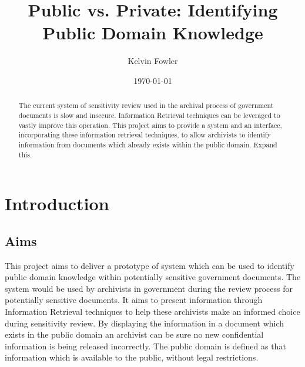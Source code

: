 \documentclass{l4proj}
\title{Public vs. Private: \newline Identifying Public Domain Knowledge}
\author{Kelvin Fowler}
\date{\today}
\begin{document}
\maketitle

\begin{abstract}
The current system of sensitivity review used in the archival process of government documents is slow and insecure. Information Retrieval techniques can be leveraged to vastly improve this operation. This project aims to provide a system and an interface, incorporating these information retrieval techniques, to allow archivists to identify information from documents which already exists within the public domain.
Expand this.
\end{abstract}


\educationalconsent

\tableofcontents

\chapter{Introduction}

\section{Aims}
This project aims to deliver a prototype of system which can be used to identify public domain knowledge within potentially sensitive government documents. The system would be used by archivists in government during the review process for potentially sensitive documents. It aims to present information through Information Retrieval techniques to help these archivists make an informed choice during sensitivity review. By displaying the information in a document which exists in the public domain an archivist can be sure no new confidential information is being released incorrectly.
The public domain is defined as that information which is available to the public, without legal restrictions.
\end{document}
